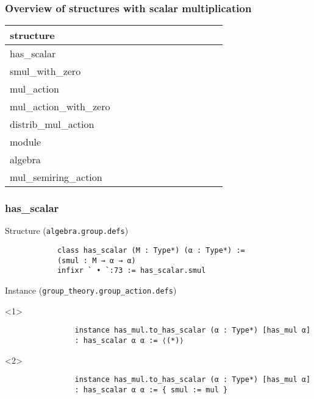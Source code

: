 \documentclass{beamer}
\newcommand{\yes}{\checkmark}
\newcommand{\no}{}
\begin{document}
	\begin{frame}[t]
	\frametitle{Overview of structures with scalar multiplication}
		\begin{tabular}{l*{11}{@{}c}}
			structure &
				 &
				 &
				 &
				 &
				 &
				 &
				 &
				 &
				 &
				 &
				\\
			\hline
			has\_scalar				&\yes	&\no	&\no	&\no	&\no	&\no	&\no	&\no	&\no	&\no	&\\
			smul\_with\_zero		&\yes	&\yes	&\yes	&\no	&\no	&\no	&\no	&\no	&\no	&\no	&\\
			mul\_action				&\yes	&\no	&\no	&\yes	&\yes	&\no	&\no	&\no	&\no	&\no	&\\
			mul\_action\_with\_zero	&\yes	&\yes	&\yes	&\yes	&\yes	&\no	&\no	&\no	&\no	&\no	&\\
			distrib\_mul\_action	&\yes	&\yes	&\no	&\yes	&\yes	&\yes	&\no	&\no	&\no	&\no	&\\
			module					&\yes	&\yes	&\yes	&\yes	&\yes	&\yes	&\yes	&\no	&\no	&\no	&\\
			algebra					&\yes	&\yes	&\yes	&\yes	&\yes	&\yes	&\yes	&\yes	&\no	&\no	&\\
			mul\_semiring\_action	&\yes	&\yes	&\no	&\yes	&\yes	&\yes	&\no	&\no	&\yes	&\yes	&\\
		\end{tabular}
	\end{frame}

	\begin{frame}[t, fragile]
	\frametitle{has\_scalar}
		\begin{block}{Structure (\texttt{algebra.group.defs})}
			\begin{lstlisting}
			class has_scalar (M : Type*) (α : Type*) :=
			(smul : M → α → α)
			infixr ` • `:73 := has_scalar.smul
			\end{lstlisting}
		\end{block}

		\begin{block}{Instance (\texttt{group\_theory.group\_action.defs})}
			\begin{onlyenv}<1>
			\begin{lstlisting}
				instance has_mul.to_has_scalar (α : Type*) [has_mul α]
				: has_scalar α α := ⟨(*)⟩
			\end{lstlisting}
			\end{onlyenv}

			\begin{onlyenv}<2>
			\begin{lstlisting}
				instance has_mul.to_has_scalar (α : Type*) [has_mul α]
				: has_scalar α α := { smul := mul }
			\end{lstlisting}
			\end{onlyenv}
		\end{block}
	\end{frame}
\end{document}
